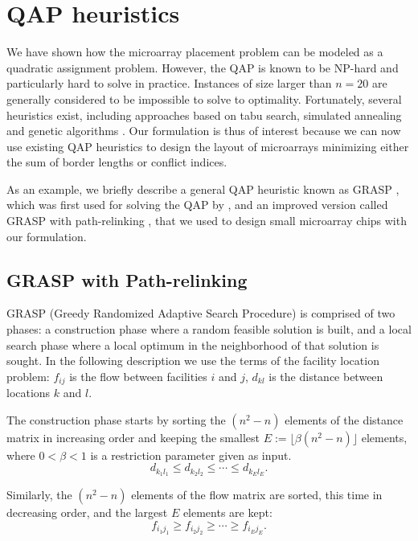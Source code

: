 \section{QAP heuristics}
\label{sec:qap_heuristics}

We have shown how the microarray placement problem can be modeled as a
quadratic assignment problem. However, the QAP is known to be NP-hard and
particularly hard to solve in practice. Instances of size larger than
$n = 20$ are generally considered to be impossible to solve to
optimality. Fortunately, several heuristics exist, including approaches based on
tabu search, simulated annealing and genetic algorithms
\citep[for a survey, see][]{Cela1997}. Our formulation is thus of interest
because we can now use existing QAP heuristics to design the layout of
microarrays minimizing either the sum of border lengths or conflict indices.

As an example, we briefly describe a general QAP heuristic known as GRASP \citep
{Li1994}, which was first used for solving the QAP by \citet{Feo1995}, and an
improved version called GRASP with path-relinking \citep{Oliveira2004}, that we
used to design small microarray chips with our formulation.

\subsection{GRASP with Path-relinking}
\label{sec:qap_grasp}

GRASP (Greedy Randomized Adaptive Search Procedure) is comprised of two phases:
a construction phase where a random feasible solution is built, and a local
search phase where a local optimum in the neighborhood of that solution is
sought. In the following description we use the terms of the facility location
problem: $f_{ij}$ is the flow between facilities $i$ and $j$, $d_{kl}$ is the
distance between locations $k$ and $l$.

The construction phase starts by sorting the $(n^2 - n)$ elements of the
distance matrix in increasing order and keeping the smallest
$E:= \lfloor \beta (n^2 - n) \rfloor$ elements, where $0 < \beta < 1$ is a
restriction parameter given as input.
\begin{displaymath}
d_{k_1 l_1} \le d_{k_2 l_2} \le \cdots \le d_{k_E l_E}.
\end{displaymath}

Similarly, the $(n^2 - n)$ elements of the flow matrix are sorted, this time in
decreasing order, and the largest $E$ elements are kept:
\begin{displaymath}
f_{i_1 j_1} \ge f_{i_2 j_2} \ge \cdots \ge f_{i_E j_E}.
\end{displaymath}

